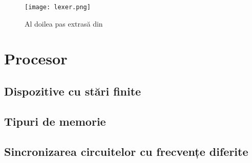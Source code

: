\documentclass[../main.tex]{subfiles}
\begin{document}
\begin{figure}[h]
    \centering
    \texttt{[image: lexer.png]}
    \caption{Al doilea pas extrasă din \cite{lexer}}
    \label{fig:lexer}
\end{figure}

\section{Procesor}
\subsection{Dispozitive cu stări finite}
\cite{fsm}
\subsection{Tipuri de memorie}
\cite{cache}
\cite{block_memory}
\subsection{Sincronizarea circuitelor cu frecvențe diferite}
\cite{sync}
\end{document}

